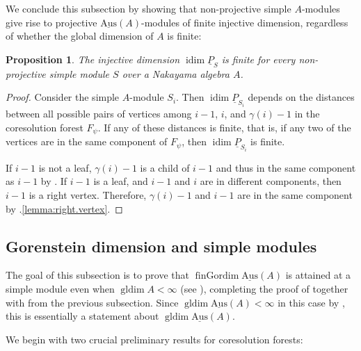 \documentclass[a4paper]{amsart}
\newtheorem{proposition}[theorem]{Proposition}
\theoremstyle{definition}
\theoremstyle{remark}
\numberwithin{equation}{theorem}
\newcommand{\sAus}{\operatorname{\underline{Aus}}}
\newcommand{\pstab}[1]{\underline{P}_{#1}}
\newcommand{\fingordim}{\operatorname{finGordim}}
\newcommand{\idim}{\operatorname{idim}}
\newcommand{\gldim}{\operatorname{gldim}}
\newcommand{\psiforest}{F_\psi}
\begin{document}
We conclude this subsection by showing that non-projective simple $ A $-modules give rise to projective $ \sAus(A) $-modules of finite injective dimension, regardless of whether the global dimension of $A$ is finite:

\begin{proposition}\label{thm:idim-simple-finite}
    The injective dimension $ \idim \pstab S $ is finite for every non-pro\-jec\-tive simple module $ S $ over a Nakayama algebra $A$.
\end{proposition}

\begin{proof}
  Consider the simple $A$-module $S_i$.  Then $\idim \pstab{S_i}$
  depends on the distances between all possible pairs of vertices
  among $i-1$, $i$, and $\gamma(i)-1$ in the coresolution forest
  $\psiforest$.  If any of these distances is finite, that is, if any
  two of the vertices are in the same component of $ \psiforest $,
  then $\idim \pstab{S_i}$ is finite.

  If $i - 1$ is not a leaf, $\gamma(i) - 1$ is a child of $i-1$ and
  thus in the same component as $i-1$ by .
  If $i-1$ is a leaf, and $i - 1$ and $i$ are in different components,
  then $i-1$ is a right vertex. Therefore, $\gamma(i)-1$ and $i-1$ are in the same component by .\eqref{lemma:right.vertex}.
\end{proof}

\subsection{Gorenstein dimension and simple modules}\label{sec:main-results-simples}
The goal of this subsection is to prove that $ \fingordim \sAus(A)$ is attained at a simple module even when $ \gldim A < \infty $ (see ), completing the proof of  together with  from the previous subsection. Since $ \gldim \sAus(A) < \infty $ in this case by \cite[Proposition II.3.9]{AR}, this is essentially a statement about $ \gldim \sAus(A) $.

We begin with two crucial preliminary results for coresolution forests:
\end{document}
